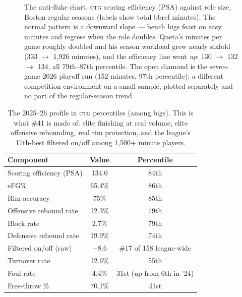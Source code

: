 \documentclass[11pt]{article}
\newcommand{\ctg}{\textsc{ctg}}
\begin{document}
\begin{figure}[h]
\centering
{}
\caption{The anti-fluke chart. \ctg{} scoring efficiency (PSA) against role size,
Boston regular seasons (labels show total bbref minutes). The normal pattern is a
downward slope --- bench bigs feast on easy minutes and regress when the role doubles.
Queta's minutes per game roughly doubled and his season workload grew nearly sixfold
(333 $\to$ 1{,}926 minutes), and the efficiency line went \emph{up}: 130 $\to$ 132
$\to$ 134, all 79th--87th percentile. The open diamond is the seven-game 2026 playoff
run (152 minutes, 97th percentile): a different competition environment on a small
sample, plotted separately and no part of the regular-season trend.}
\label{fig:path}
\end{figure}

\begin{table}[h]
\centering\small
\caption{The 2025--26 profile in \ctg{} percentiles (among bigs). This is what \#41 is
made of: elite finishing at real volume, elite offensive rebounding, real rim
protection, and the league's 17th-best filtered on/off among 1{,}500+ minute players.}
\begin{tabular}{lcc}
\toprule
Component & Value & Percentile \\
\midrule
Scoring efficiency (PSA) & 134.0 & 84th \\
eFG\% & 65.4\% & 86th \\
Rim accuracy & 75\% & 85th \\
Offensive rebound rate & 12.3\% & 79th \\
Block rate & 2.7\% & 79th \\
Defensive rebound rate & 19.9\% & 74th \\
Filtered on/off (raw) & $+8.6$ & \#17 of 158 league-wide \\
Turnover rate & 12.6\% & 55th \\
Foul rate & 4.4\% & 31st (up from 6th in '24) \\
Free-throw \% & 70.1\% & 41st \\
\bottomrule
\end{tabular}
\label{tab:profile}
\end{table}
\end{document}
